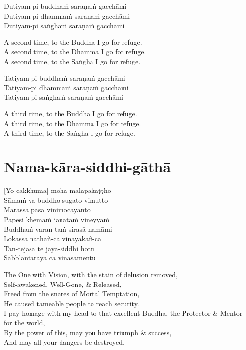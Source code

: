 Dutiyam-pi buddhaṁ saraṇaṁ gacchāmi\\
Dutiyam-pi dhammaṁ saraṇaṁ gacchāmi\\
Dutiyam-pi saṅghaṁ saraṇaṁ gacchāmi

\begin{english-verses}
  A second time, to the Buddha I go for refuge.\\
  A second time, to the Dhamma I go for refuge.\\
  A second time, to the Saṅgha I go for refuge.
\end{english-verses}

Tatiyam-pi buddhaṁ saraṇaṁ gacchāmi\\
Tatiyam-pi dhammaṁ saraṇaṁ gacchāmi\\
Tatiyam-pi saṅghaṁ saraṇaṁ gacchāmi

\begin{english-verses}
  A third time, to the Buddha I go for refuge.\\
  A third time, to the Dhamma I go for refuge.\\
  A third time, to the Saṅgha I go for refuge.
\end{english-verses}

\vspace{1em}

\section{Nama-kāra-siddhi-gāthā}
\label{nama-kara-siddhi-gatha}

\vspace{-1em}

[Yo cakkhumā] moha-malāpakaṭṭho\\
Sāmaṁ va buddho sugato vimutto\\
Mārassa pāsā vinimocayanto\\
Pāpesi khemaṁ janataṁ vineyyaṁ\\
Buddhaṁ varan-taṁ sirasā namāmi\\
Lokassa nāthañ-ca vināyakañ-ca\\
Tan-tejasā te jaya-siddhi hotu\\
Sabb'antarāyā ca vināsamentu

\begin{english-verses}
  The One with Vision, with the stain of delusion removed,\\
  Self-awakened, Well-Gone, \& Released,\\
  Freed from the snares of Mortal Temptation,\\
  He caused tameable people to reach security.\\
  I pay homage with my head to that excellent Buddha, the Protector \& Mentor for the world,\\
  By the power of this, may you have triumph \& success,\\
  And may all your dangers be destroyed.
\end{english-verses}

